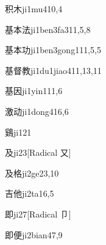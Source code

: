 \begin{verbete}{积木}{ji1mu4}{10,4}
\end{verbete}

\begin{verbete}{基本法}{ji1ben3fa3}{11,5,8}
\end{verbete}

\begin{verbete}{基本功}{ji1ben3gong1}{11,5,5}
\end{verbete}

\begin{verbete}{基督教}{ji1du1jiao4}{11,13,11}
\end{verbete}

\begin{verbete}{基因}{ji1yin1}{11,6}
\end{verbete}

\begin{verbete}{激动}{ji1dong4}{16,6}
\end{verbete}

\begin{verbete}{鷄}{ji1}{21}
\end{verbete}

\begin{verbete}{及}{ji2}{3}[Radical 又]
\end{verbete}

\begin{verbete}{及格}{ji2ge2}{3,10}
\end{verbete}

\begin{verbete}{吉他}{ji2ta1}{6,5}
\end{verbete}

\begin{verbete}{即}{ji2}{7}[Radical 卩]
\end{verbete}

\begin{verbete}{即便}{ji2bian4}{7,9}
\end{verbete}

